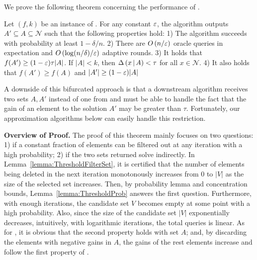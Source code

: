 We prove the following theorem concerning the performance of \threseq.
\begin{theorem} \label{thm:threshold}
Let $(f,k)$ be an instance of \sm . For any constant $\varepsilon$, 
the algorithm \threseq outputs $A'\subseteq A \subseteq \mathcal{N}$ such that the following properties hold:
1) The algorithm succeeds with probability at least $1 - \delta/n$.
2) There are $O\left( n/\varepsilon \right)$ oracle queries in expectation and $O\left( \log (n/\delta)/\varepsilon \right)$ adaptive rounds.
3) It holds that $f(A') \ge (1-\varepsilon)\tau |A|$.
If $|A| < k$, then $\Delta \left( x \, | \, A \right) < \tau$ for all $x\in \mathcal{N}$.
4) It also holds that $f(A')\ge f(A)$ and $|A'|\ge (1-\varepsilon)|A|$
\end{theorem}
A downside of this bifurcated approach is that a downstream algorithm
receives two sets $A, A'$ instead of one from \threseq and must be able to handle
the fact that the gain of an element to the solution $A'$ may be greater
than $\tau$. Fortunately, our approximation algorithms below can easily
handle this restriction. 

\textbf{Overview of Proof.}
The proof of this theorem mainly focuses on two questions: 
1) if a constant fraction of elements can be filtered out
at any iteration with a high probability;
2) if the two sets returned solve \tp indirectly.
In Lemma~\ref{lemma:ThresholdFilterSet},
it is certified that the number of elements being deleted
in the next iteration monotonously increases from 0 to $|V|$ 
as the size of the selected set increases.
Then, by probability lemma and concentration bounds,
Lemma~\ref{lemma:ThresholdProb} answers the first question.
Furthermore, with enough iterations, the candidate set $V$ becomes
empty at some point with a high probability.
Also, since the size of the candidate set $|V|$ exponentially decreases,
intuitively, with logarithmic iterations, the total queries is linear. 
As for \tp, it is obvious that the second property holds with set $A$;
and, by discarding the elements with negative gains in $A$,
the gains of the rest elements increase and follow the first property of \tp.

